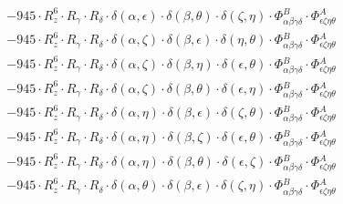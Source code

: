 \documentclass{article}
\begin{document}
\begin{equation}
\begin{array}{c}
 \\[0.2em] 		 - 945 \cdot R_{z}^{6} \cdot R_{\gamma{}} \cdot R_{\delta{}} \cdot \delta{}\left(\alpha{}, \epsilon{}\right) \cdot \delta{}\left(\beta{}, \theta{}\right) \cdot \delta{}\left(\zeta{}, \eta{}\right) \cdot \Phi{}^{B}_{\alpha{}\beta{}\gamma{}\delta{}} \cdot \Phi{}^{A}_{\epsilon{}\zeta{}\eta{}\theta{}} 
 \\[0.2em] 		 - 945 \cdot R_{z}^{6} \cdot R_{\gamma{}} \cdot R_{\delta{}} \cdot \delta{}\left(\alpha{}, \zeta{}\right) \cdot \delta{}\left(\beta{}, \epsilon{}\right) \cdot \delta{}\left(\eta{}, \theta{}\right) \cdot \Phi{}^{B}_{\alpha{}\beta{}\gamma{}\delta{}} \cdot \Phi{}^{A}_{\epsilon{}\zeta{}\eta{}\theta{}} 
 \\[0.2em] 		 - 945 \cdot R_{z}^{6} \cdot R_{\gamma{}} \cdot R_{\delta{}} \cdot \delta{}\left(\alpha{}, \zeta{}\right) \cdot \delta{}\left(\beta{}, \eta{}\right) \cdot \delta{}\left(\epsilon{}, \theta{}\right) \cdot \Phi{}^{B}_{\alpha{}\beta{}\gamma{}\delta{}} \cdot \Phi{}^{A}_{\epsilon{}\zeta{}\eta{}\theta{}} 
 \\[0.2em] 		 - 945 \cdot R_{z}^{6} \cdot R_{\gamma{}} \cdot R_{\delta{}} \cdot \delta{}\left(\alpha{}, \zeta{}\right) \cdot \delta{}\left(\beta{}, \theta{}\right) \cdot \delta{}\left(\epsilon{}, \eta{}\right) \cdot \Phi{}^{B}_{\alpha{}\beta{}\gamma{}\delta{}} \cdot \Phi{}^{A}_{\epsilon{}\zeta{}\eta{}\theta{}} 
 \\[0.2em] 		 - 945 \cdot R_{z}^{6} \cdot R_{\gamma{}} \cdot R_{\delta{}} \cdot \delta{}\left(\alpha{}, \eta{}\right) \cdot \delta{}\left(\beta{}, \epsilon{}\right) \cdot \delta{}\left(\zeta{}, \theta{}\right) \cdot \Phi{}^{B}_{\alpha{}\beta{}\gamma{}\delta{}} \cdot \Phi{}^{A}_{\epsilon{}\zeta{}\eta{}\theta{}} 
 \\[0.2em] 		 - 945 \cdot R_{z}^{6} \cdot R_{\gamma{}} \cdot R_{\delta{}} \cdot \delta{}\left(\alpha{}, \eta{}\right) \cdot \delta{}\left(\beta{}, \zeta{}\right) \cdot \delta{}\left(\epsilon{}, \theta{}\right) \cdot \Phi{}^{B}_{\alpha{}\beta{}\gamma{}\delta{}} \cdot \Phi{}^{A}_{\epsilon{}\zeta{}\eta{}\theta{}} 
 \\[0.2em] 		 - 945 \cdot R_{z}^{6} \cdot R_{\gamma{}} \cdot R_{\delta{}} \cdot \delta{}\left(\alpha{}, \eta{}\right) \cdot \delta{}\left(\beta{}, \theta{}\right) \cdot \delta{}\left(\epsilon{}, \zeta{}\right) \cdot \Phi{}^{B}_{\alpha{}\beta{}\gamma{}\delta{}} \cdot \Phi{}^{A}_{\epsilon{}\zeta{}\eta{}\theta{}} 
 \\[0.2em] 		 - 945 \cdot R_{z}^{6} \cdot R_{\gamma{}} \cdot R_{\delta{}} \cdot \delta{}\left(\alpha{}, \theta{}\right) \cdot \delta{}\left(\beta{}, \epsilon{}\right) \cdot \delta{}\left(\zeta{}, \eta{}\right) \cdot \Phi{}^{B}_{\alpha{}\beta{}\gamma{}\delta{}} \cdot \Phi{}^{A}_{\epsilon{}\zeta{}\eta{}\theta{}} 

\end{array}
\end{equation}
\end{document}
